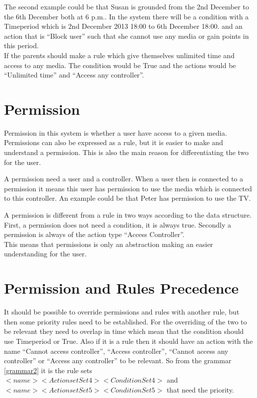 The second example could be that Susan is grounded from the 2nd December to the 6th December both at 6 p.m.. In the system there will be a condition with a Timeperiod which is 2nd December 2013 18:00 to 6th December 18:00.
and an action that is ``Block user'' such that she cannot use any media or gain points in this period. \\

If the parents should make a rule which give themselves unlimited time and access to any media. The condition would be True and the actions would be ``Unlimited time'' and ``Access any controller''.\\


\section{Permission}
Permission in this system is whether a user have access to a given media. Permissions can also be expressed as a rule, but it is easier to make and understand a permission. This is also the main reason for differentiating the two for the user. 

A permission need a user and a controller. When a user then is connected to a permission it means this user has permission to use the media which is connected to this controller. An example could be that Peter has permission to use the TV. 

A permission is different from a rule in two ways according to the data structure. First, a permission does not need a condition, it is always true. Secondly a permission is always of the action type ``Access Controller''.\\
This means that permissions is only an abstraction making an easier understanding for the user.


\section{Permission and Rules Precedence}
\label{sec:permissionAndRulesPrecedence}
It should be possible to override permissions and rules with another rule, but then some priority rules  need to be established. 
For the overriding of the two to be relevant they need to overlap in time which mean that the condition should use Timeperiod or True. Also if it is a rule then it should have an action with the name ``Cannot access controller'', ``Access controller'', ``Cannot access any controller'' or ``Access any controller'' to be relevant. So from the grammar \ref{grammar2} it is the rule sets $<name> <ActionsetSet4><ConditionSet4>$  and $<name> <ActionsetSet5><ConditionSet5>$ that need the priority.

